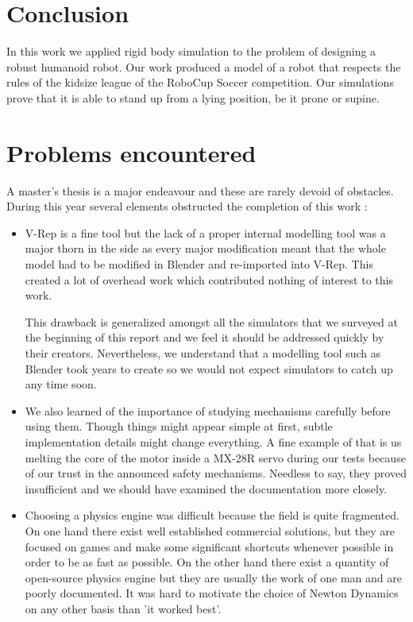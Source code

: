 \section{Conclusion}
In this work we applied rigid body simulation to the problem of designing a robust humanoid robot. Our work produced a model of a robot that respects the rules of the kidsize league of the RoboCup Soccer competition. Our simulations prove that it is able to stand up from a lying position, be it prone or supine. 

\section{Problems encountered}
A master's thesis is a major endeavour and these are rarely devoid of obstacles. During this year several elements obstructed the completion of this work : \begin{itemize}
\item V-Rep is a fine tool but the lack of a proper internal modelling tool was a major thorn in the side as every major modification meant that the whole model had to be modified in Blender and re-imported into V-Rep. This created a lot of overhead work which contributed nothing of interest to this work. 

This drawback is generalized amongst all the simulators that we surveyed at the beginning of this report and we feel it should be addressed quickly by their creators. Nevertheless, we understand that a modelling tool such as Blender took years to create so we would not expect simulators to catch up any time soon.

\item We also learned of the importance of studying mechanisms carefully before using them. Though things might appear simple at first, subtle implementation details might change everything. A fine example of that is us melting the core of the motor inside a MX-28R servo during our tests because of our trust in the announced safety mechanisms. Needless to say, they proved insufficient and we should have examined the documentation more closely.

\item Choosing a physics engine was difficult because the field is quite fragmented. On one hand there exist well established commercial solutions, but they are focused on games and make some significant shortcuts whenever possible in order to be as fast as possible. On the other hand there exist a quantity of open-source physics engine but they are usually the work of one man and are poorly documented. It was hard to motivate the choice of Newton Dynamics on any other basis than 'it worked best'.
\end{itemize}

